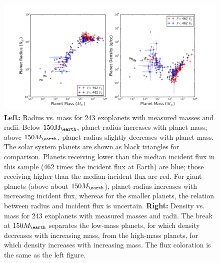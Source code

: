 \documentclass[iop]{emulateapj}
\begin{document}
\clearpage
\begin{figure}[htbp] %
   \centering
   \includegraphics[width=6in]{mrf.png} 
   \caption{\small \textbf{Left:} Radius vs. mass for 243 exoplanets with measured masses and radii.  Below $150 \mearth$, planet radius increases with planet mass; above $150 \mearth$, planet radius slightly decreases with planet mass.  The solar system planets are shown as black triangles for comparison.  Planets receiving lower than the median incident flux in this sample (462 times the incident flux at Earth) are blue; those receiving higher than the median incident flux are red.    For giant planets (above about $150 \mearth$), planet radius increases with increasing incident flux, whereas for the smaller planets, the relation between radius and incident flux is uncertain.  \textbf{Right:} Density vs. mass for 243 exoplanets with measured masses and radii.  The break at $150 \mearth$ separates the low-mass planets, for which density decreases with increasing mass, from the high-mass planets, for which density increases with increasing mass.  The flux coloration is the same as the left figure.}
\label{fig:mrf}
\end{figure}
\end{document}
